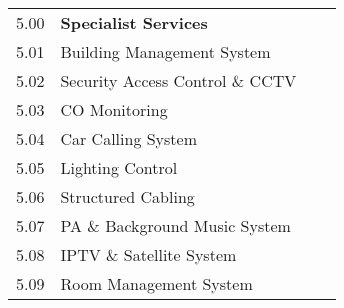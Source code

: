 \begin{longtable}{lll@{}l@{}}
\midrule
5.00	&\textbf{Specialist Services}		&&\\
5.01	&Building Management System	&&\\	
5.02	&Security Access Control \& CCTV	&&\\	
5.03	&CO Monitoring		&&\\
5.04	&Car Calling System		&&\\
5.05	&Lighting Control		&&\\
5.06	&Structured Cabling		&&\\
5.07	&PA \& Background Music System &&\\		
5.08	&IPTV \& Satellite System	&&\\	
5.09	&Room Management System	&&\\

\bottomrule
\end{longtable}

